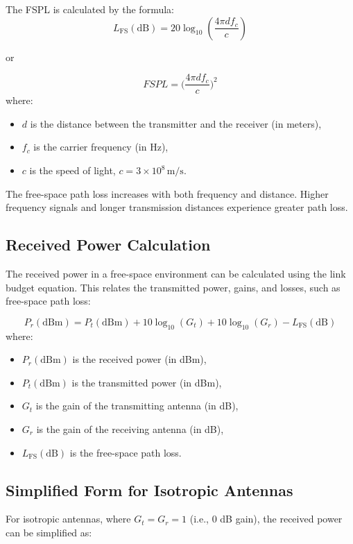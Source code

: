 \documentclass[a4paper,12pt]{book}
\begin{document}
	The FSPL is calculated by the formula:
	\[
	L_{\text{FS}}(\text{dB}) = 20 \log_{10} \left( \frac{4\pi d f_c}{c} \right)
	\]
	
	or
	
	\[
		FSPL = \bigg(\frac{4\pi df_c}{c}\bigg)^2
	\]
	where:
	\begin{itemize}
		\item \( d \) is the distance between the transmitter and the receiver (in meters),
		\item \( f_c \) is the carrier frequency (in Hz),
		\item \( c \) is the speed of light, \(c = 3 \times 10^8 \, \text{m/s}\).
	\end{itemize}
	
	The free-space path loss increases with both frequency and distance. Higher frequency signals and longer transmission distances experience greater path loss.
	
	\subsection{Received Power Calculation}
	
	The received power in a free-space environment can be calculated using the link budget equation. This relates the transmitted power, gains, and losses, such as free-space path loss:
	
	\[
	P_r (\text{dBm}) = P_t (\text{dBm}) + 10 \log_{10}(G_t) + 10 \log_{10}(G_r) - L_{\text{FS}} (\text{dB})
	\]
	where:
	\begin{itemize}
		\item \( P_r (\text{dBm}) \) is the received power (in dBm),
		\item \( P_t (\text{dBm}) \) is the transmitted power (in dBm),
		\item \( G_t \) is the gain of the transmitting antenna (in dB),
		\item \( G_r \) is the gain of the receiving antenna (in dB),
		\item \( L_{\text{FS}} (\text{dB}) \) is the free-space path loss.
	\end{itemize}
	
	\subsection{Simplified Form for Isotropic Antennas}
	
	For isotropic antennas, where \( G_t = G_r = 1 \) (i.e., 0 dB gain), the received power can be simplified as:
	
\end{document}
